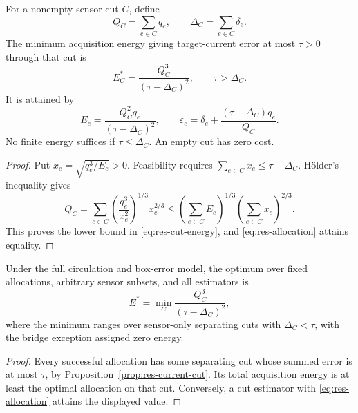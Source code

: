 \begin{theorem}
\label{thm:res-cut-allocation}
For a nonempty sensor cut $C$, define
\[
 Q_C=\sum_{e\in C}q_e,\qquad
 \Delta_C=\sum_{e\in C}\delta_e.
\]
The minimum acquisition energy giving target-current error at most $\tau>0$
through that cut is
\begin{equation}
 E_C^*=\frac{Q_C^3}{(\tau-\Delta_C)^2},\qquad \tau>\Delta_C.
 \label{eq:res-cut-energy}
\end{equation}
It is attained by
\begin{equation}
 E_e=\frac{Q_C^2q_e}{(\tau-\Delta_C)^2},\qquad
 \varepsilon_e=\delta_e+
       \frac{(\tau-\Delta_C)q_e}{Q_C}.
 \label{eq:res-allocation}
\end{equation}
No finite energy suffices if $\tau\leq\Delta_C$. An empty cut has zero cost.
\end{theorem}

\begin{proof}
Put $x_e=\sqrt{q_e^3/E_e}>0$. Feasibility requires
$\sum_{e\in C}x_e\leq\tau-\Delta_C$. H\"older's inequality gives
\[
 Q_C=\sum_{e\in C}
       \left(\frac{q_e^3}{x_e^2}\right)^{1/3}x_e^{2/3}
 \leq\left(\sum_{e\in C}E_e\right)^{1/3}
       \left(\sum_{e\in C}x_e\right)^{2/3}.
\]
This proves the lower bound in \eqref{eq:res-cut-energy}, and
\eqref{eq:res-allocation} attains equality.
\end{proof}

\begin{corollary}
\label{cor:res-global-energy}
Under the full circulation and box-error model, the optimum over fixed
allocations, arbitrary sensor subsets, and all estimators is
\begin{equation}
 E^*=\min_C\frac{Q_C^3}{(\tau-\Delta_C)^2},
 \label{eq:res-global-energy}
\end{equation}
where the minimum ranges over sensor-only separating cuts with
$\Delta_C<\tau$, with the bridge exception assigned zero energy.
\end{corollary}

\begin{proof}
Every successful allocation has some separating cut whose summed error is
at most $\tau$, by Proposition~\ref{prop:res-current-cut}. Its total acquisition
energy is at least the optimal allocation on that cut. Conversely, a cut
estimator with \eqref{eq:res-allocation} attains the displayed value.
\end{proof}

